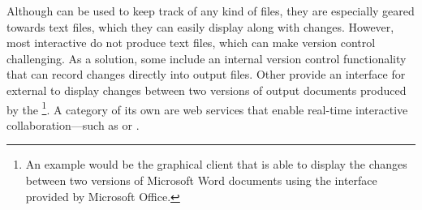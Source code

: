 \begin{figure}
  
\end{figure}

\begin{figure}
  
\end{figure}

%  

Although  can be used to keep track of any kind of files, they are
especially geared towards text files, which they can easily display along with
changes. However, most interactive  do not produce text files, which
can make version control challenging. As a solution, some  include
an internal version control functionality that can record changes directly into
output files. Other  provide an interface for external 
to display changes between two versions of output documents produced by the
\footnote{%
  An example would be the graphical  client  that is able to display the changes between two versions
  of Microsoft Word documents using the interface provided by Microsoft Office.
}. A category of its own are web services that enable real-time interactive
collaboration---such as  or .

